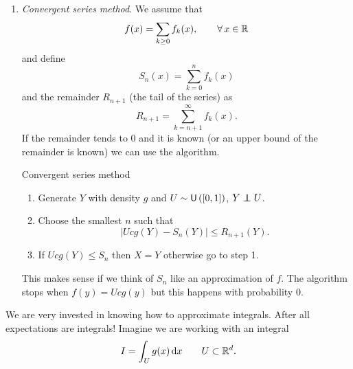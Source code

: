 \documentclass[12pt]{report}
\begin{document}
\begin{enumerate}[\circnum]
	Notice that $c$ should be as small as possible. For example, consider 
	\begin{equation*}
		f(x)=\frac{2}{\sqrt{\pi}}\sqrt{x}e^{-x}\indig{x\geq0}\sim\Gamma\left(\sfrac{3}{2},1\right).
	\end{equation*}
	We can set 
	\begin{equation*}
		g(x)=\lambda e^{-\lambda x}\indig{x\geq0}. 
	\end{equation*}
	We need to find $\lambda$ and $c>0$ such that 
	\begin{equation*}
		f(x)\leq cg(x) \every x\in\R.
	\end{equation*}
	Do it as an exercise.
	\item \emph{Convergent series method}. We assume that 
	\begin{equation*}
		f(x)=\sum_{k\geq0}f_{k}(x),\qquad\forall\, x\in\mathbb{R}
	\end{equation*}
	and define
	\begin{equation*}
		S_{n}(x)=\sum_{k=0}^{n}f_{k}(x)
	\end{equation*}
	and the remainder $R_{n+1}$ (the tail of the series) as
	\begin{equation*}
		R_{n+1}=\sum_{k=n+1}^{\infty}f_{k}(x).
	\end{equation*}
	If the remainder tends to 0 and it is known (or an upper bound of the remainder is known) we can use the algorithm.
	\begin{algobox}{Convergent series method}
		\begin{enumerate}
			\item Generate $Y$ with density $g$ and $U\sim\mathsf{U}\left([0,1]\right)$, $Y\independent U$.
			\item Choose the smallest $n$ such that
			\begin{equation*}
				\left|Ucg(Y)-S_{n}(Y)\right|\leq R_{n+1}(Y).
			\end{equation*}
			\item If $Ucg(Y)\leq S_{n}$ then $X=Y$ otherwise go to step 1.
		\end{enumerate}
	\end{algobox}
	This makes sense if we think of $S_{n}$ like an approximation of $f$. The algorithm stops when $f(y)=Ucg(y)$ but this happens with probability 0.
\end{enumerate}
We are very invested in knowing how to approximate integrals. After all expectations are integrals! Imagine we are working with an integral
\begin{equation*}
	I=\int_{U}g(x)\mathop{}\!\mathrm{d} x\qquad U\subset\mathbb{R}^{d}.
\end{equation*}
\end{document}

